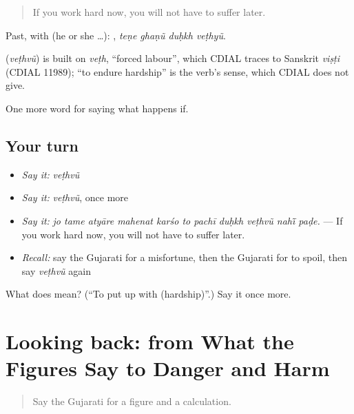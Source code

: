 \begin{quote}
If you work hard now, you will not have to suffer later.
\end{quote}

Past, with  (he or she …):    , \emph{teṇe ghaṇũ duḥkh veṭhyũ}.

\begin{cousinweb}
\textbf{} (\emph{veṭhvũ}) is built on \emph{veṭh}, \textquotedblleft{}forced labour\textquotedblright{}, which CDIAL traces to Sanskrit \emph{viṣṭi} (CDIAL 11989); \textquotedblleft{}to endure hardship\textquotedblright{} is the verb's sense, which CDIAL does not give.
\end{cousinweb}

\begin{grammarlens}[title={What you've built}]
One more word for saying what happens if.
\end{grammarlens}

\subsection*{Your turn}
\begin{itemize}
\raggedright
  \item \emph{Say it:} \emph{veṭhvũ}
  \item \emph{Say it:} \emph{veṭhvũ}, once more
  \item \emph{Say it:} \emph{jo tame atyāre mahenat karśo to pachī duḥkh veṭhvũ nahī̃ paḍe.} — If you work hard now, you will not have to suffer later.
  \item \emph{Recall:} say the Gujarati for a misfortune, then the Gujarati for to spoil, then say \emph{veṭhvũ} again
\end{itemize}

\begin{tcolorbox}[breakable,colback=teal!4,colframe=teal!35!black,title={Before you move on}]
What does  mean? (\textquotedblleft{}To put up with (hardship)\textquotedblright{}.) Say it once more.
\end{tcolorbox}
\section[(dialogue)]{Looking back: from What the Figures Say to Danger and Harm}

\label{lesson:GU-R370-review-363-370}



\begin{quote}
Say the Gujarati for a figure and a calculation.
\end{quote}

